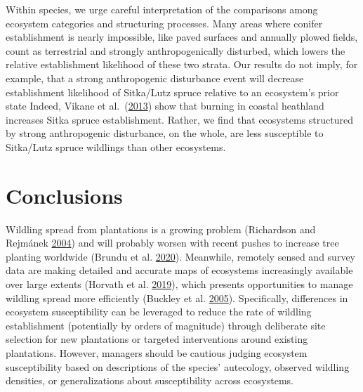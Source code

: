 \documentclass[
]{article}
\begin{document}
Within species, we urge careful interpretation of the comparisons among ecosystem categories and structuring processes.
Many areas where conifer establishment is nearly impossible, like paved surfaces and annually plowed fields, count as terrestrial and strongly anthropogenically disturbed, which lowers the relative establishment likelihood of these two strata.
Our results do not imply, for example, that a strong anthropogenic disturbance event will decrease establishment likelihood of Sitka/Lutz spruce relative to an ecosystem's prior state Indeed, Vikane et al.~(\protect\hyperlink{ref-vikaneInvasionCallunaHeath2013}{2013}) show that burning in coastal heathland increases Sitka spruce establishment.
Rather, we find that ecosystems structured by strong anthropogenic disturbance, on the whole, are less susceptible to Sitka/Lutz spruce wildlings than other ecosystems.

\hypertarget{conclusions}{%
\section{Conclusions}\label{conclusions}}

Wildling spread from plantations is a growing problem (Richardson and Rejmánek \protect\hyperlink{ref-richardsonConifersInvasiveAliens2004}{2004}) and will probably worsen with recent pushes to increase tree planting worldwide (Brundu et al. \protect\hyperlink{ref-brunduGlobalGuidelinesSustainable2020}{2020}).
Meanwhile, remotely sensed and survey data are making detailed and accurate maps of ecosystems increasingly available over large extents (Horvath et al. \protect\hyperlink{ref-horvathDistributionModellingVegetation2019}{2019}), which presents opportunities to manage wildling spread more efficiently (Buckley et al. \protect\hyperlink{ref-buckleySlowingPineInvasion2005}{2005}).
Specifically, differences in ecosystem susceptibility can be leveraged to
reduce the rate of wildling establishment (potentially by orders of magnitude) through deliberate site selection for new plantations or targeted interventions around existing plantations.
However, managers should be cautious judging ecosystem susceptibility based on descriptions of the species' autecology, observed wildling densities, or generalizations about susceptibility across ecosystems.
\end{document}
